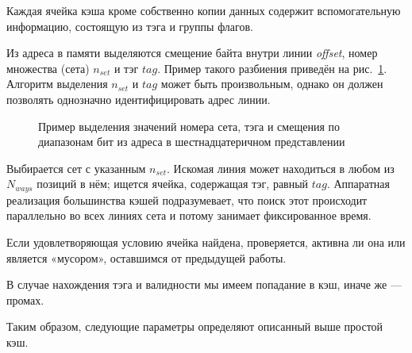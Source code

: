 \begin{enumerate*}
\item Каждая ячейка кэша кроме собственно копии данных содержит вспомогательную информацию, состоящую из тэга и группы флагов.

\item Из адреса в памяти выделяются смещение байта внутри линии \textit{offset}, номер множества (сета) $n_{set}$ и тэг $tag$. Пример такого разбиения приведён на рис.~\ref{fig:set-tag-flags}. Алгоритм выделения $n_{set}$ и $tag$ может быть произвольным, однако он должен позволять однозначно идентифицировать адрес линии.

\begin{figure}[htb]
    \centering
    \caption[Пример выделения значений номера сета, тэга и смещения из адреса]{Пример выделения значений номера сета, тэга и смещения по диапазонам бит из адреса в шестнадцатеричном представлении}
    \label{fig:set-tag-flags}
\end{figure}


\item Выбирается сет с указанным $n_{set}$. Искомая линия может находиться в любом из $N_{ways}$ позиций в нём; ищется ячейка, содержащая тэг, равный $tag$. Аппаратная реализация большинства кэшей подразумевает, что поиск этот происходит параллельно во всех линиях сета и потому занимает фиксированное время.

\item Если удовлетворяющая условию ячейка найдена, проверяется, активна ли она или является «мусором», оставшимся от предыдущей работы.

\item В случае нахождения тэга и валидности мы имеем попадание в кэш, иначе же --- промах.
\end{enumerate*}

Таким образом, следующие параметры определяют описанный выше простой кэш.

